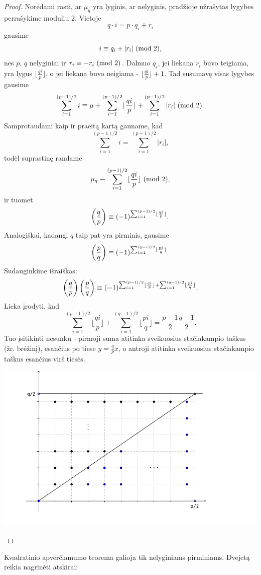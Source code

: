 \begin{proof}
Norėdami rasti, ar $\mu_q$ yra lyginis, ar nelyginis, pradžioje užrašytas
lygybes perrašykime moduliu $2$. Vietoje
$$q\cdot i = p\cdot q_i + r_i$$ 
gausime 
$$i \equiv q_i + |r_i| \ (\text{mod } 2),$$ 
nes $p$, $q$ nelyginiai ir $r_i \equiv -r_i \ (\text{mod } 2)$. Dalmuo $q_i$, jei
liekana $r_i$ buvo teigiama, yra lygus $\lfloor\frac{qi}{p}\rfloor$, o jei
liekana buvo neigiama - $\lfloor\frac{qi}{p}\rfloor+1$. Tad susumavę visas
lygybes gausime 
$$\sum_{i=1}^{(p-1)/2}i \equiv \mu +
\sum_{i=1}^{(p-1)/2}\lfloor\frac{qi}{p}\rfloor +
\sum_{i=1}^{(p-1)/2}|r_i|\ (\text{mod } 2).$$ 
Samprotaudami kaip ir praeitą kartą gauname, kad 
$$\sum_{i=1}^{(p-1)/2}i=\sum_{i=1}^{(p-1)/2}|r_i|,$$ 
todėl suprastinę randame 
$$\mu_q \equiv \sum_{i=1}^{(p-1)/2}\lfloor\frac{qi}{p}\rfloor\ (\text{mod } 2),$$	
ir tuomet
$$\left(\frac{q}{p}\right) \equiv
(-1)^{\sum_{i=1}^{(p-1)/2}\lfloor\frac{qi}{p}\rfloor}.$$	
Analogiškai, kadangi $q$ taip pat yra pirminis, gausime
$$\left(\frac{p}{q}\right) \equiv
(-1)^{\sum_{i=1}^{(q-1)/2}\lfloor\frac{pi}{q}\rfloor}.$$	
Sudauginkime išraiškas:
$$\left(\frac{q}{p}\right)\left(\frac{p}{q}\right) \equiv
(-1)^{\sum_{i=1}^{(p-1)/2}\lfloor\frac{qi}{p}\rfloor +
\sum_{i=1}^{(q-1)/2}\lfloor\frac{pi}{q}\rfloor}.$$	
Lieka įrodyti, kad 
$$\sum_{i=1}^{(p-1)/2}\lfloor\frac{qi}{p}\rfloor +
\sum_{i=1}^{(q-1)/2}\lfloor\frac{pi}{q}\rfloor =
\frac{p-1}{2}\frac{q-1}{2}.$$
Tuo įsitikinti nesunku - pirmoji suma atitinka sveikuosius stačiakampio
taškus (žr.  brėžinį), esančius po tiese $y=\frac{q}{p} x$, o antroji
atitinka sveikuosius stačiakampio taškus esančius virš tiesės.
\begin{center}
  \includegraphics[scale=1]{./iliustracijos/skteorija/gardele.pdf} 
\end{center}
\end{proof}

Kvadratinio apverčiamumo teorema galioja tik nelyginiams pirminiams.
Dvejetą reikia nagrinėti atskirai:

